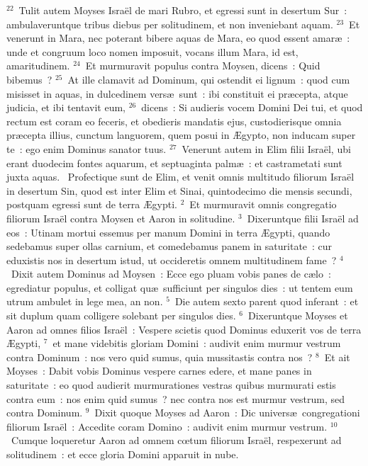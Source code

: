 ${}^{22}$~Tulit autem Moyses Isra\"el de mari Rubro, et egressi sunt in desertum Sur~: ambulaveruntque tribus diebus per solitudinem, et non inveniebant aquam.
${}^{23}$~Et venerunt in Mara, nec poterant bibere aquas de Mara, eo quod essent amar\ae~: unde et congruum loco nomen imposuit, vocans illum Mara, id est, amaritudinem.
${}^{24}$~Et murmuravit populus contra Moysen, dicens~: Quid bibemus~?
${}^{25}$~At ille clamavit ad Dominum, qui ostendit ei lignum~: quod cum misisset in aquas, in dulcedinem vers\ae\ sunt~: ibi constituit ei pr\ae cepta, atque judicia, et ibi tentavit eum,
${}^{26}$~dicens~: Si audieris vocem Domini Dei tui, et quod rectum est coram eo feceris, et obedieris mandatis ejus, custodierisque omnia pr\ae cepta illius, cunctum languorem, quem posui in \AE gypto, non inducam super te~: ego enim Dominus sanator tuus.
${}^{27}$~Venerunt autem in Elim filii Isra\"el, ubi erant duodecim fontes aquarum, et septuaginta palm\ae~: et castrametati sunt juxta aquas.
~Profectique sunt de Elim, et venit omnis multitudo filiorum Isra\"el in desertum Sin, quod est inter Elim et Sinai, quintodecimo die mensis secundi, postquam egressi sunt de terra \AE gypti.
${}^{2}$~Et murmuravit omnis congregatio filiorum Isra\"el contra Moysen et Aaron in solitudine.
${}^{3}$~Dixeruntque filii Isra\"el ad eos~: Utinam mortui essemus per manum Domini in terra \AE gypti, quando sedebamus super ollas carnium, et comedebamus panem in saturitate~: cur eduxistis nos in desertum istud, ut occideretis omnem multitudinem fame~?
${}^{4}$~Dixit autem Dominus ad Moysen~: Ecce ego pluam vobis panes de c\ae lo~: egrediatur populus, et colligat qu\ae\ sufficiunt per singulos dies~: ut tentem eum utrum ambulet in lege mea, an non.
${}^{5}$~Die autem sexto parent quod inferant~: et sit duplum quam colligere solebant per singulos dies.
${}^{6}$~Dixeruntque Moyses et Aaron ad omnes filios Isra\"el~: Vespere scietis quod Dominus eduxerit vos de terra \AE gypti,
${}^{7}$~et mane videbitis gloriam Domini~: audivit enim murmur vestrum contra Dominum~: nos vero quid sumus, quia mussitastis contra nos~?
${}^{8}$~Et ait Moyses~: Dabit vobis Dominus vespere carnes edere, et mane panes in saturitate~: eo quod audierit murmurationes vestras quibus murmurati estis contra eum~: nos enim quid sumus~? nec contra nos est murmur vestrum, sed contra Dominum.
${}^{9}$~Dixit quoque Moyses ad Aaron~: Dic univers\ae\ congregationi filiorum Isra\"el~: Accedite coram Domino~: audivit enim murmur vestrum.
${}^{10}$~Cumque loqueretur Aaron ad omnem cœtum filiorum Isra\"el, respexerunt ad solitudinem~: et ecce gloria Domini apparuit in nube.
